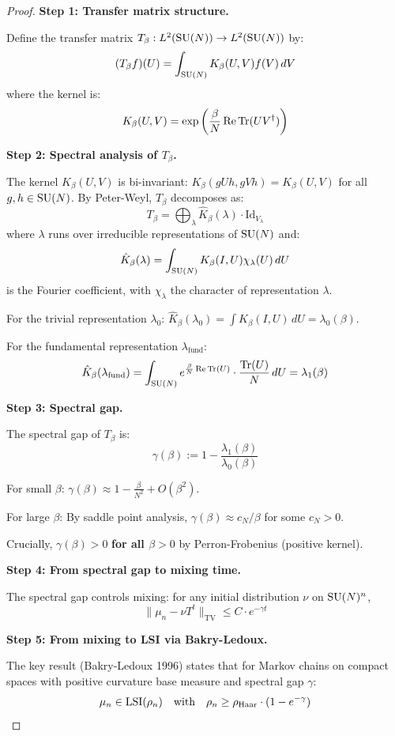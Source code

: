 \begin{proof}
\textbf{Step 1: Transfer matrix structure.}

Define the transfer matrix $T_\beta: L^2(\mathrm{SU}(N)) \to L^2(\mathrm{SU}(N))$ by:
\[
(T_\beta f)(U) = \int_{\mathrm{SU}(N)} K_\beta(U, V) f(V) \, dV
\]
where the kernel is:
\[
K_\beta(U, V) = \exp\left(\frac{\beta}{N} \operatorname{Re}\operatorname{Tr}(UV^\dagger)\right)
\]

\textbf{Step 2: Spectral analysis of $T_\beta$.}

The kernel $K_\beta(U, V)$ is bi-invariant: $K_\beta(gUh, gVh) = K_\beta(U, V)$ for all 
$g, h \in \mathrm{SU}(N)$. By Peter-Weyl, $T_\beta$ decomposes as:
\[
T_\beta = \bigoplus_{\lambda} \hat{K}_\beta(\lambda) \cdot \mathrm{Id}_{V_\lambda}
\]
where $\lambda$ runs over irreducible representations of $\mathrm{SU}(N)$ and:
\[
\hat{K}_\beta(\lambda) = \int_{\mathrm{SU}(N)} K_\beta(I, U) \chi_\lambda(U) \, dU
\]
is the Fourier coefficient, with $\chi_\lambda$ the character of representation $\lambda$.

For the trivial representation $\lambda_0$: $\hat{K}_\beta(\lambda_0) = \int K_\beta(I, U) \, dU = \lambda_0(\beta)$.

For the fundamental representation $\lambda_{\mathrm{fund}}$:
\[
\hat{K}_\beta(\lambda_{\mathrm{fund}}) = \int_{\mathrm{SU}(N)} e^{\frac{\beta}{N}\operatorname{Re}\operatorname{Tr}(U)} \cdot \frac{\operatorname{Tr}(U)}{N} \, dU = \lambda_1(\beta)
\]

\textbf{Step 3: Spectral gap.}

The spectral gap of $T_\beta$ is:
\[
\gamma(\beta) := 1 - \frac{\lambda_1(\beta)}{\lambda_0(\beta)}
\]

For small $\beta$: $\gamma(\beta) \approx 1 - \frac{\beta}{N^2} + O(\beta^2)$.

For large $\beta$: By saddle point analysis, $\gamma(\beta) \approx c_N/\beta$ for some $c_N > 0$.

Crucially, $\gamma(\beta) > 0$ \textbf{for all $\beta > 0$} by Perron-Frobenius (positive kernel).

\textbf{Step 4: From spectral gap to mixing time.}

The spectral gap controls mixing: for any initial distribution $\nu$ on $\mathrm{SU}(N)^n$,
\[
\|\mu_n - \nu T^t\|_{\mathrm{TV}} \leq C \cdot e^{-\gamma t}
\]

\textbf{Step 5: From mixing to LSI via Bakry-Ledoux.}

The key result (Bakry-Ledoux 1996) states that for Markov chains on compact spaces 
with positive curvature base measure and spectral gap $\gamma$:
\[
\mu_n \in \operatorname{LSI}(\rho_n) \quad \text{with} \quad \rho_n \geq \rho_{\mathrm{Haar}} \cdot (1 - e^{-\gamma})
\]


\end{proof}
